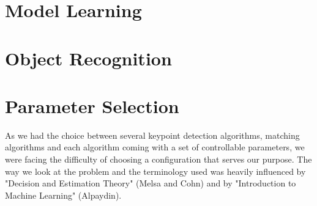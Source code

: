 
\section{Model Learning}

\section{Object Recognition}

\section{Parameter Selection}

As we had the choice between several keypoint detection algorithms, matching
algorithms and each algorithm coming with a set of controllable parameters, we
were facing the difficulty of choosing a configuration that serves our purpose.
The way we look at the problem and the terminology used was heavily influenced
by "Decision and Estimation Theory" (Melsa and Cohn) and by "Introduction to
Machine Learning" (Alpaydin).


